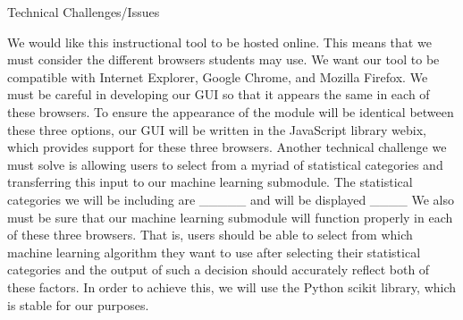 \documentclass[letterpaper, 10pt,titlepage]{article}
\begin{document}
\begin{section}{Technical Challenges/Issues}


We would like this instructional tool to be hosted online. This means that we must consider the different browsers students may use. We want our tool to be compatible with Internet Explorer, Google Chrome, and Mozilla Firefox. We must be careful in developing our GUI so that it appears the same in each of these browsers. To ensure the appearance of the module will be identical between these three options, our GUI will be written in the JavaScript library webix, which provides support for these three browsers. Another technical challenge we must solve is allowing users to select from a myriad of statistical categories and transferring this input to our machine learning submodule. The statistical categories we will be including are _____ and will be displayed ____ We also must be sure that our machine learning submodule will function properly in each of these three browsers. That is, users should be able to select from which machine learning algorithm they want to use after selecting their statistical categories and the output of such a decision should accurately reflect both of these factors. In order to achieve this, we will use the Python scikit library, which is stable for our purposes.  


\bigbreak
\bigbreak
\bigbreak
\end{section}
\end{document}
